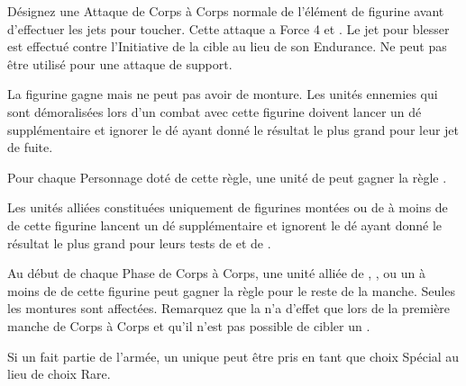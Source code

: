 \armyspecialruleentry{\petrifyingstare}

Désignez une Attaque de Corps à Corps normale de l'élément de figurine avant d'effectuer les jets pour toucher. Cette attaque a Force 4 et . Le jet pour blesser est effectué contre l'Initiative de la cible au lieu de son Endurance. Ne peut pas être utilisé pour une attaque de support.

\setlength{\columnseprule}{0.5pt}
\renewcommand{\columnseprulecolor}{\color{black!30}}
\begin{multicols}{2}\raggedcolumns
\armyspecialruleentry{\fleetcommander}

La figurine gagne  mais ne peut pas avoir de monture. Les unités ennemies qui sont démoralisées lors d'un combat avec cette figurine doivent lancer un dé supplémentaire et ignorer le dé ayant donné le résultat le plus grand pour leur jet de fuite.

Pour chaque Personnage doté de cette règle, une unité de \corsairs{} peut gagner la règle \vanguard{}.

\columnbreak
\armyspecialruleentry{\beastmaster}

Les unités alliées constituées uniquement de figurines montées ou de \monsters{} à moins de  de cette figurine lancent un dé supplémentaire et ignorent le dé ayant donné le résultat le plus grand pour leurs tests de \frenzy{} et de \stupidity{}.

Au début de chaque Phase de Corps à Corps, une unité alliée de \cavalry{}, \chariot{}, \monstrouscavalry{} ou un \monster{} à moins de  de cette figurine peut gagner la règle \hatred{} pour le reste de la manche. Seules les montures sont affectées. Remarquez que la \hatred{} n'a d'effet que lors de la première manche de Corps à Corps et qu'il n'est pas possible de cibler un \riddenmonster{}.

Si un \beastmaster{} fait partie de l'armée, un unique \kraken{} peut être pris en tant que choix Spécial au lieu de choix Rare.

\end{multicols}
\setlength{\columnseprule}{0pt}

\closearmyspecialrules





